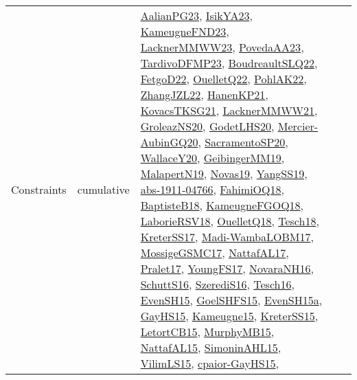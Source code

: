 {\begin{longtable}{lp{3cm}>{\raggedright}p{6cm}>{\raggedright}p{6cm}p{8cm}}
Constraints & cumulative & \href{papers/AalianPG23.pdf}{AalianPG23}\cite{AalianPG23}, \href{articles/IsikYA23.pdf}{IsikYA23}\cite{IsikYA23}, \href{papers/KameugneFND23.pdf}{KameugneFND23}\cite{KameugneFND23}, \href{articles/LacknerMMWW23.pdf}{LacknerMMWW23}\cite{LacknerMMWW23}, \href{papers/PovedaAA23.pdf}{PovedaAA23}\cite{PovedaAA23}, \href{papers/TardivoDFMP23.pdf}{TardivoDFMP23}\cite{TardivoDFMP23}, \href{papers/BoudreaultSLQ22.pdf}{BoudreaultSLQ22}\cite{BoudreaultSLQ22}, \href{articles/FetgoD22.pdf}{FetgoD22}\cite{FetgoD22}, \href{papers/OuelletQ22.pdf}{OuelletQ22}\cite{OuelletQ22}, \href{articles/PohlAK22.pdf}{PohlAK22}\cite{PohlAK22}, \href{papers/ZhangJZL22.pdf}{ZhangJZL22}\cite{ZhangJZL22}, \href{papers/HanenKP21.pdf}{HanenKP21}\cite{HanenKP21}, \href{papers/KovacsTKSG21.pdf}{KovacsTKSG21}\cite{KovacsTKSG21}, \href{papers/LacknerMMWW21.pdf}{LacknerMMWW21}\cite{LacknerMMWW21}, \href{papers/GroleazNS20.pdf}{GroleazNS20}\cite{GroleazNS20}, \href{papers/GodetLHS20.pdf}{GodetLHS20}\cite{GodetLHS20}, \href{papers/Mercier-AubinGQ20.pdf}{Mercier-AubinGQ20}\cite{Mercier-AubinGQ20}, \href{articles/SacramentoSP20.pdf}{SacramentoSP20}\cite{SacramentoSP20}, \href{articles/WallaceY20.pdf}{WallaceY20}\cite{WallaceY20}, \href{papers/GeibingerMM19.pdf}{GeibingerMM19}\cite{GeibingerMM19}, \href{papers/MalapertN19.pdf}{MalapertN19}\cite{MalapertN19}, \href{articles/Novas19.pdf}{Novas19}\cite{Novas19}, \href{papers/YangSS19.pdf}{YangSS19}\cite{YangSS19}, \href{articles/abs-1911-04766.pdf}{abs-1911-04766}\cite{abs-1911-04766}, \href{articles/FahimiOQ18.pdf}{FahimiOQ18}\cite{FahimiOQ18}, \href{articles/BaptisteB18.pdf}{BaptisteB18}\cite{BaptisteB18}, \href{papers/KameugneFGOQ18.pdf}{KameugneFGOQ18}\cite{KameugneFGOQ18}, \href{articles/LaborieRSV18.pdf}{LaborieRSV18}\cite{LaborieRSV18}, \href{papers/OuelletQ18.pdf}{OuelletQ18}\cite{OuelletQ18}, \href{papers/Tesch18.pdf}{Tesch18}\cite{Tesch18}, \href{articles/KreterSS17.pdf}{KreterSS17}\cite{KreterSS17}, \href{papers/Madi-WambaLOBM17.pdf}{Madi-WambaLOBM17}\cite{Madi-WambaLOBM17}, \href{papers/MossigeGSMC17.pdf}{MossigeGSMC17}\cite{MossigeGSMC17}, \href{articles/NattafAL17.pdf}{NattafAL17}\cite{NattafAL17}, \href{papers/Pralet17.pdf}{Pralet17}\cite{Pralet17}, \href{papers/YoungFS17.pdf}{YoungFS17}\cite{YoungFS17}, \href{articles/NovaraNH16.pdf}{NovaraNH16}\cite{NovaraNH16}, \href{papers/SchuttS16.pdf}{SchuttS16}\cite{SchuttS16}, \href{papers/SzerediS16.pdf}{SzerediS16}\cite{SzerediS16}, \href{papers/Tesch16.pdf}{Tesch16}\cite{Tesch16}, \href{papers/EvenSH15.pdf}{EvenSH15}\cite{EvenSH15}, \href{articles/GoelSHFS15.pdf}{GoelSHFS15}\cite{GoelSHFS15}, \href{articles/EvenSH15a.pdf}{EvenSH15a}\cite{EvenSH15a}, \href{papers/GayHS15.pdf}{GayHS15}\cite{GayHS15}, \href{articles/Kameugne15.pdf}{Kameugne15}\cite{Kameugne15}, \href{papers/KreterSS15.pdf}{KreterSS15}\cite{KreterSS15}, \href{articles/LetortCB15.pdf}{LetortCB15}\cite{LetortCB15}, \href{papers/MurphyMB15.pdf}{MurphyMB15}\cite{MurphyMB15}, \href{articles/NattafAL15.pdf}{NattafAL15}\cite{NattafAL15}, \href{articles/SimoninAHL15.pdf}{SimoninAHL15}\cite{SimoninAHL15}, \href{papers/VilimLS15.pdf}{VilimLS15}\cite{VilimLS15}, \href{papers/cpaior-GayHS15.pdf}{cpaior-GayHS15}\cite{cpaior-GayHS15}, 
\end{longtable}}
